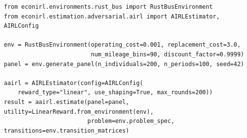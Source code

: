 \documentclass[11pt]{article}
\begin{document}
\begin{lstlisting}
from econirl.environments.rust_bus import RustBusEnvironment
from econirl.estimation.adversarial.airl import AIRLEstimator, AIRLConfig

env = RustBusEnvironment(operating_cost=0.001, replacement_cost=3.0,
                         num_mileage_bins=90, discount_factor=0.9999)
panel = env.generate_panel(n_individuals=200, n_periods=100, seed=42)

aairl = AIRLEstimator(config=AIRLConfig(
    reward_type="linear", use_shaping=True, max_rounds=200))
result = aairl.estimate(panel=panel, utility=LinearReward.from_environment(env),
                        problem=env.problem_spec, transitions=env.transition_matrices)
\end{lstlisting}
\end{document}
